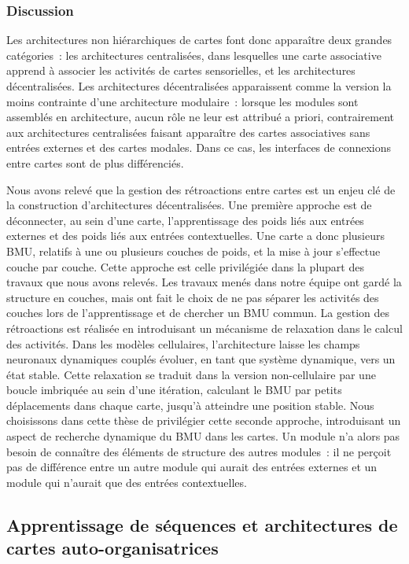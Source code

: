 \documentclass[../main]{subfiles}
\begin{document}
\subsubsection{Discussion}

Les architectures non hiérarchiques de cartes font donc apparaître deux grandes catégories~: les architectures centralisées, dans lesquelles une carte associative apprend à associer les activités de cartes sensorielles, et les architectures décentralisées.
Les architectures décentralisées apparaissent comme la version la moins contrainte d'une architecture modulaire~: lorsque les modules sont assemblés en architecture, aucun rôle ne leur est attribué a priori, contrairement aux architectures centralisées faisant apparaître des cartes associatives sans entrées externes et des cartes modales. Dans ce cas, les interfaces de connexions entre cartes sont de plus différenciés.

Nous avons relevé que la gestion des rétroactions entre cartes est un enjeu clé de la construction d'architectures décentralisées. Une première approche est de déconnecter, au sein d'une carte, l'apprentissage des poids liés aux entrées externes et des poids liés aux entrées contextuelles. Une carte a donc plusieurs BMU, relatifs à une ou plusieurs couches de poids, et la mise à jour s'effectue couche par couche. Cette approche est celle privilégiée dans la plupart des travaux que nous avons relevés.
Les travaux menés dans notre équipe ont gardé la structure en couches, mais ont fait le choix de ne pas séparer les activités des couches lors de l'apprentissage et de chercher un BMU commun.
La gestion des rétroactions est réalisée en introduisant un mécanisme de relaxation dans le calcul des activités. Dans les modèles cellulaires, l'architecture laisse les champs neuronaux dynamiques couplés évoluer, en tant que système dynamique, vers un état stable. Cette relaxation se traduit dans la version non-cellulaire par une boucle imbriquée au sein d'une itération, calculant le BMU par petits déplacements dans chaque carte, jusqu'à atteindre une position stable.
Nous choisissons dans cette thèse de privilégier cette seconde approche, introduisant un aspect de recherche dynamique du BMU dans les cartes. Un module n'a alors pas besoin de connaître des éléments de structure des autres modules~: il ne perçoit pas de différence entre un autre module qui aurait des entrées externes et un module qui n'aurait que des entrées  contextuelles.


\subsection{Apprentissage de séquences et architectures de cartes auto-organisatrices}
\end{document}
